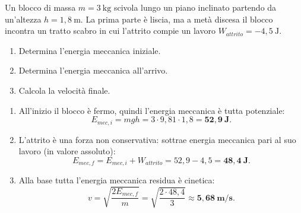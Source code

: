 
\begin{question}[ID=3.2, subtitle={Blocco su piano inclinato con regione di attrito a metà discesa}, tags={conservazione energia, attrito}, difficulty=facile]
Un blocco di massa $m = 3\ \text{kg}$ scivola lungo un piano inclinato partendo da un'altezza $h = 1{,}8\ \text{m}$. La prima parte è liscia, ma a metà discesa il blocco incontra un tratto scabro in cui l'attrito compie un lavoro $W_{attrito} = -4{,}5\ \text{J}$.
\begin{enumerate}
    \item Determina l'energia meccanica iniziale.
    \item Determina l'energia meccanica all'arrivo.
    \item Calcola la velocità finale.
\end{enumerate}
\begin{solution}
\begin{enumerate}
    \item All'inizio il blocco è fermo, quindi l'energia meccanica è tutta potenziale:
    \[
    E_{mec,i} = mgh = 3\cdot 9{,}81\cdot 1{,}8 = \mathbf{52{,}9\ \text{J}}.
    \]
    \item L'attrito è una forza non conservativa: sottrae energia meccanica pari al suo lavoro (in valore assoluto):
    \[
    E_{mec,f} = E_{mec,i} + W_{attrito} = 52{,}9 - 4{,}5 = \mathbf{48{,}4\ \text{J}}.
    \]
    \item Alla base tutta l'energia meccanica residua è cinetica:
    \[
    v = \sqrt{\frac{2E_{mec,f}}{m}} = \sqrt{\frac{2\cdot 48{,}4}{3}} \approx \mathbf{5{,}68\ \text{m/s}}.
    \]
\end{enumerate}
\end{solution}
\end{question}


